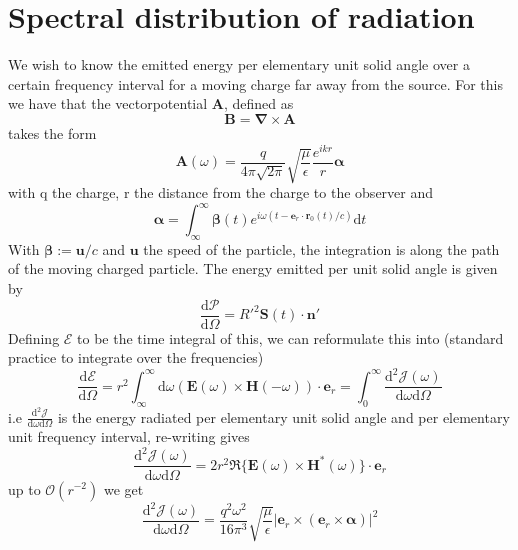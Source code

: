 \documentclass[11pt,a4paper,faculty=we,language=en,doctype=report]{cls/ugent-doc}
\begin{document}
\section{Spectral distribution of radiation}
We wish to know the emitted energy per elementary unit solid angle over a certain frequency interval for a moving charge far away from the source. For this we have that the vectorpotential $\mathbf{A}$, defined as
\begin{equation}
	\mathbf{B} = \mathbf{\nabla}\times \mathbf{A}
\end{equation}
takes the form
\begin{equation}
	\mathbf{A}(\omega) = \frac{q}{4\pi \sqrt{2\pi}} \sqrt{\frac{\mu}{\epsilon}} \frac{e^{ikr}}{r} \boldsymbol{\alpha}
\end{equation}
with q the charge, r the distance from the charge to the observer and 
\begin{equation}
	\boldsymbol{\alpha} = \int_\infty^\infty \boldsymbol{\beta}(t) e^{i\omega(t-\boldsymbol{e}_r\cdot \boldsymbol{r}_0(t)/c)}\text{d}t
\end{equation}
With $\boldsymbol{\beta}:= \boldsymbol{u}/c$ and $\boldsymbol{u}$ the speed of the particle, the integration is along the path of the moving charged particle. 
The energy emitted per unit solid angle is given by
\begin{equation}
	\frac{\text{d} \mathscr{P}}{\text{d} \Omega} = R'^2\mathbf{S}(t)\cdot\mathbf{n}'
\end{equation}
Defining $\mathscr{E}$ to be the time integral of this, we can reformulate this into (standard practice to integrate over the frequencies)
\begin{equation}
	\frac{\text{d} \mathscr{E}}{\text{d} \Omega} = r^2\int_\infty^\infty \text{d}\omega (\mathbf{E}(\omega)\times\mathbf{H}(-\omega))\cdot\mathbf{e}_r  = \int_0^\infty \frac{\text{d}^2 \mathscr{J}(\omega)}{\text{d} \omega \text{d} \Omega}
\end{equation}
i.e $\frac{\text{d}^2 \mathscr{J}}{\text{d}\omega \text{d}\Omega}$ is the energy radiated per elementary unit solid angle and per elementary unit frequency interval, re-writing gives
\begin{equation}
	\frac{\text{d}^2 \mathscr{J}(\omega)}{\text{d} \omega \text{d} \Omega} = 2r^2 \Re\{\mathbf{E}(\omega)\times\mathbf{H}^*(\omega)\}\cdot\mathbf{e}_r 
\end{equation}
up to $\mathcal{O}(r^{-2})$ we get
\begin{equation}
	\frac{\text{d}^2 \mathscr{J}(\omega)}{\text{d} \omega \text{d} \Omega} = \frac{q^2\omega^2}{16\pi^3}\sqrt{\frac{\mu}{\epsilon}}|\mathbf{e}_r\times(\mathbf{e}_r\times\boldsymbol{\alpha})|^2\label{equation: 4.123 in elektromagnetisme}
\end{equation}
\end{document}
